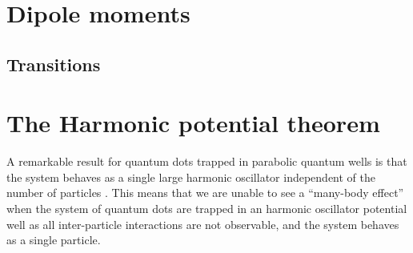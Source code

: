     \section{Dipole moments}
        \subsection{Transitions}

    \section{The Harmonic potential theorem}
        A remarkable result for quantum dots trapped in parabolic quantum wells
        is that the system behaves as a single large harmonic oscillator
        independent of the number of particles \cite{kohn, brey}.
        This means that we are unable to see a ``many-body effect'' when the
        system of quantum dots are trapped in an harmonic oscillator potential
        well as all inter-particle interactions are not observable, and the
        system behaves as a single particle.
